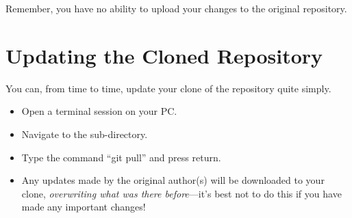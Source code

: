 Remember, you have no ability to upload your changes to the original repository.

\section{Updating the Cloned Repository}

You can, from time to time, update your clone of the repository quite simply.

\begin{itemize}
    \item Open a terminal session on your PC.
    \item Navigate to the  sub-directory.
    \item Type the command ``git pull'' and press return.
    \item Any updates made by the original author(s) will be downloaded to your clone, \emph{overwriting what was there before}---it's best not to do this if you have made any important changes!
\end{itemize}